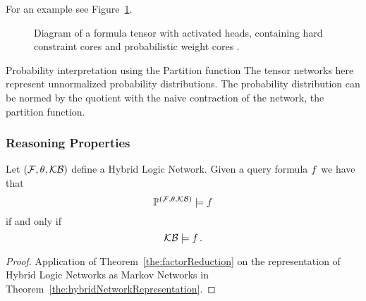 


For an example see Figure~\ref{fig:ActivatedHeads}.

\begin{figure}[h]
\begin{center}
	
\end{center}
\caption{Diagram of a formula tensor with activated heads, containing \textcolor{\concolor}{hard constraint cores} and \textcolor{\probcolor}{probabilistic weight cores} .} %
\label{fig:ActivatedHeads} 
\end{figure}



\begin{remark}{Probability interpretation using the Partition function}
	The tensor networks here represent unnormalized probability distributions.
	The probability distribution can be normed by the quotient with the naive contraction of the network, the partition function.
\end{remark}


\subsubsection{Reasoning Properties}



\begin{theorem}
	Let $(\mathcal{F},\theta,\mathcal{KB})$ define a Hybrid Logic Network.
	Given a query formula $f$ we have that 
		\[ \mathbb{P}^{(\mathcal{F},\theta,\mathcal{KB})} \models f \]
	if and only if
		\[ \mathcal{KB} \models f \, . \]
\end{theorem}
\begin{proof}
	Application of Theorem~\ref{the:factorReduction} on the representation of Hybrid Logic Networks as Markov Networks in Theorem~\ref{the:hybridNetworkRepresentation}.
\end{proof}


